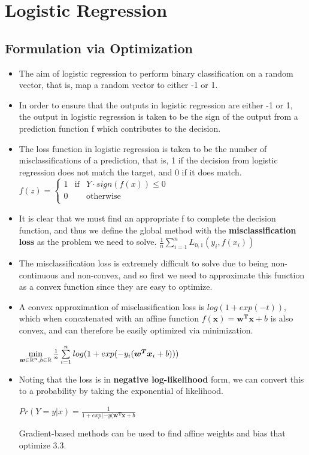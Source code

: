 \documentclass[english]{latex4ei/latex4ei_sheet}
\begin{document}
\section{Logistic Regression}
\begin{sectionbox}
\subsection{Formulation via Optimization}
\begin{itemize}
\item The aim of logistic regression to perform binary classification on a random vector, that is, map a random vector to either -1 or 1.
\item In order to ensure that the outputs in logistic regression are either -1 or 1, the output in logistic regression is taken to be the sign of the output from a prediction function f which contributes to the decision.
\item The loss function in logistic regression is taken to be the number of misclassifications of a prediction, that is, 1 if the decision from logistic regression does not match the target, and 0 if it does match.
$f(z) = \left\{ \begin{array}{rcl}
     1 & \mbox{if}
& Y\cdot sign(f(x))\leq 0 \\ 0 & & \mbox{otherwise}\\
\end{array}\right.$
\item It is clear that we must find an appropriate f  to complete the decision function, and thus we define the global method with the \textbf{misclassification loss} as the problem we need to solve.
$ \frac{1}{n}\sum\limits_{i=1}^nL_{0,1}(y_i,f(x_i))$
\item The misclassification loss is extremely difficult to solve due to being non-continuous and non-convex, and so first we need to approximate this function as a convex function since they are easy to optimize.
\item A convex approximation of misclassification loss is $log(1 + exp(-t))$, which when concatenated with  an affine function $f(\boldsymbol{x})=\boldsymbol{w^Tx}+b$ is also convex, and can therefore be easily optimized via minimization.\\
\begin{center}
\begin{emphbox}
    $\min\limits_{\boldsymbol{w}\in\operatorname{\mathbb R}^n,b\in\operatorname{\mathbb R}}\frac{1}{n}\sum\limits_{i=1}^nlog(1+exp(-y_i(\boldsymbol{w^Tx}_i+b)))$
    \end{emphbox}
\end{center}
\item Noting that the loss is in \textbf{negative log-likelihood} form, we can convert this to a probability by taking the exponential of likelihood.
\begin{emphbox}
    \begin{center}
        $Pr(Y=y|x)=\frac{1}{1+exp(-y(\boldsymbol{w^Tx}+b}$
    \end{center}
\end{emphbox}
Gradient-based methods can be used to find affine weights and bias that optimize 3.3.
\end{itemize}

\end{sectionbox}
\end{document}
